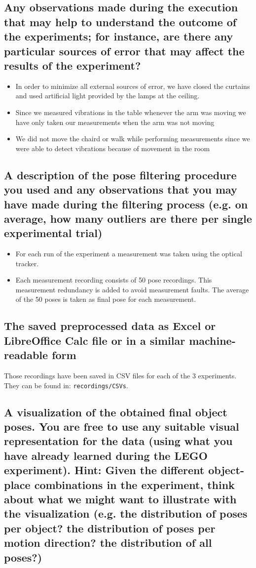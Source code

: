\subsection{Any observations made during the execution that may help to understand the outcome of the experiments; for instance, are there any particular sources of error that may affect the results of the experiment?}

\begin{itemize}
	\item In order to minimize all external sources of error, we have closed the curtains and used artificial light provided by the lamps at the ceiling.
	\item Since we measured vibrations in the table whenever the arm was moving we have only taken our measurements when the arm was not moving
	\item We did not move the chaird or walk while performing measurements since we were able to detect vibrations because of movement in the room
\end{itemize}

\subsection{A description of the pose filtering procedure you used and any observations that you may have made during the filtering process (e.g. on average, how many outliers are there per single experimental trial)}

\begin{itemize}
	\item For each run of the experiment a measurement was taken using the optical tracker.
	\item Each measurement recording consists of 50 pose recordings. This measurement redundancy is added to avoid measurement faults. The average of the 50 poses is taken as final pose for each measurement.
	
\end{itemize}


\subsection{The saved preprocessed data as Excel or LibreOffice Calc file or in a similar machine-readable form}

Those recordings have been saved in CSV files for each of the 3 experiments. They can be found in: \texttt{recordings/CSVs}.

\subsection{A visualization of the obtained final object poses. You are free to use any suitable visual representation for the data (using what you have already learned during the LEGO experiment). Hint: Given the different object-place combinations in the experiment, think about what we might want to illustrate with the visualization (e.g. the distribution of poses per object? the distribution of poses per motion direction? the distribution of all poses?)}


